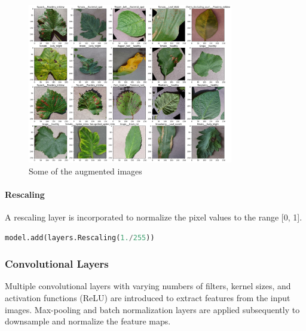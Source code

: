 \begin{figure}[H]
    \centering
    \includegraphics[width= 0.8\textwidth]{assets/augmentation.png} 
    \caption{Some of the augmented images} 
    \label{fig:immagine}
\end{figure}

\paragraph{Rescaling}

A rescaling layer is incorporated to normalize the pixel values to the range [0, 1].

\begin{lstlisting}[language=Python]
	model.add(layers.Rescaling(1./255))
\end{lstlisting}

\subsubsection{Convolutional Layers}
Multiple convolutional layers with varying numbers of filters, kernel sizes, and activation functions (ReLU) are 
introduced to extract features from the input images. Max-pooling and batch normalization layers are applied 
subsequently to downsample and normalize the feature maps.

